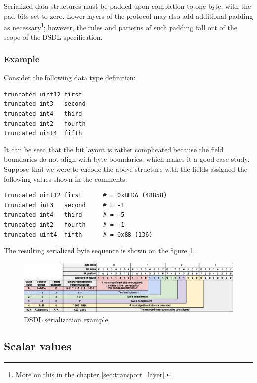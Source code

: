 Serialized data structures must be padded upon completion to one byte,
with the pad bits set to zero.
Lower layers of the protocol may also add additional padding as
necessary\footnote{More on this in the chapter \ref{sec:transport_layer}.};
however, the rules and patterns of such padding fall out of the scope of the DSDL specification.

\subsubsection{Example}

Consider the following data type definition:

\begin{verbatim}
truncated uint12 first
truncated int3   second
truncated int4   third
truncated int2   fourth
truncated uint4  fifth
\end{verbatim}

It can be seen that the bit layout is rather complicated because the field boundaries do not align with byte
boundaries, which makes it a good case study.
Suppose that we were to encode the above structure with the fields assigned the following values
shown in the comments:

\begin{verbatim}
truncated uint12 first      # = 0xBEDA (48858)
truncated int3   second     # = -1
truncated int4   third      # = -5
truncated int2   fourth     # = -1
truncated uint4  fifth      # = 0x88 (136)
\end{verbatim}

The resulting serialized byte sequence is shown on the figure \ref{fig:dsdl_serialization_example}.

\begin{figure}[H]
    \centering
	\includegraphics[width=\textwidth]{dsdl/bit-encoding}
	\caption{DSDL serialization example.\label{fig:dsdl_serialization_example}}
\end{figure}

\subsection{Scalar values}

